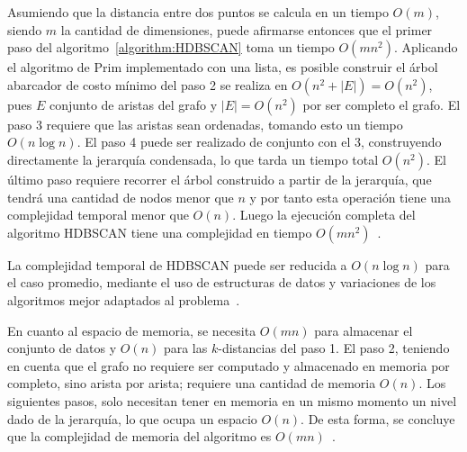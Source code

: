 Asumiendo que la distancia entre dos puntos se calcula en un tiempo $O(m)$, siendo $m$ la cantidad de dimensiones, puede afirmarse entonces que el primer paso del algoritmo~\ref{algorithm:HDBSCAN} toma un tiempo $O(m n^2)$.
Aplicando el algoritmo de Prim implementado con una lista, es posible construir el árbol abarcador de costo mínimo del paso 2 se realiza en $O(n^2+|E|) = O(n^2)$, pues $E$ conjunto de aristas del grafo y $|E|=O(n^2)$ por ser completo el grafo.
El paso 3 requiere que las aristas sean ordenadas, tomando esto un tiempo $O(n\log n)$.
El paso 4 puede ser realizado de conjunto con el 3, construyendo directamente la jerarquía condensada, lo que tarda un tiempo total $O(n^2)$.
El último paso requiere recorrer el árbol construido a partir de la jerarquía, que tendrá una cantidad de nodos menor que $n$ y por tanto esta operación tiene una complejidad temporal menor que $O(n)$.
Luego la ejecución completa del algoritmo HDBSCAN tiene una complejidad en tiempo $O(m n^2)$~\cite{Campello15}.

La complejidad temporal de HDBSCAN puede ser reducida a $O(n\log n)$ para el caso promedio, mediante el uso de estructuras de datos y variaciones de los algoritmos mejor adaptados al problema~\cite{McInnes17-2}.

En cuanto al espacio de memoria, se necesita $O(m n)$ para almacenar el conjunto de datos y $O(n)$ para las $k$-distancias del paso 1.
El paso 2, teniendo en cuenta que el grafo no requiere ser computado y almacenado en memoria por completo, sino arista por arista;
requiere una cantidad de memoria $O(n)$.
Los siguientes pasos, solo necesitan tener en memoria en un mismo momento un nivel dado de la jerarquía, lo que ocupa un espacio $O(n)$.
De esta forma, se concluye que la complejidad de memoria del algoritmo es $O(m n)$~\cite{Campello15}.
